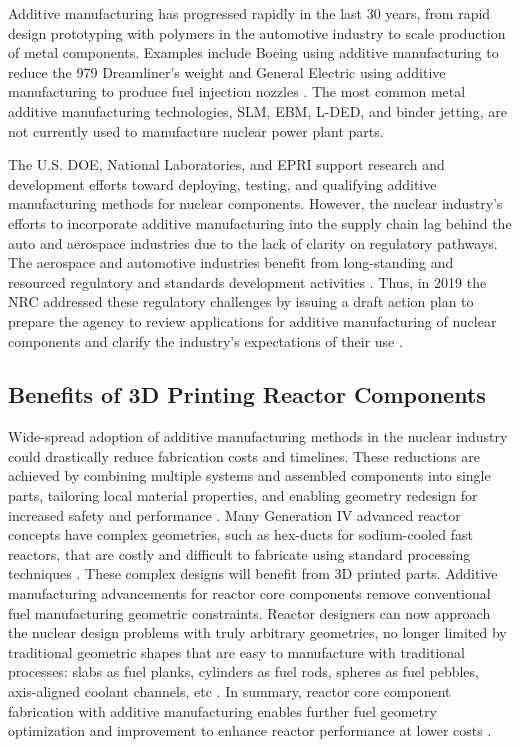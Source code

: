 Additive manufacturing has progressed rapidly in the last 30 years, from rapid 
design prototyping with polymers in the automotive industry to scale production 
of metal components.  
Examples include Boeing using additive manufacturing to reduce the 979 
Dreamliner's weight \cite{noauthor_printed_2017} and General Electric using 
additive manufacturing to produce fuel injection nozzles 
\cite{noauthor_transformation_2018}. 
The most common metal additive manufacturing technologies, \gls{SLM}, \gls{EBM}, 
\gls{L-DED}, and binder jetting, are not currently used to manufacture nuclear 
power plant parts. 

The U.S. \gls{DOE}, National Laboratories, and \gls{EPRI} support research and 
development efforts toward deploying, testing, and qualifying additive 
manufacturing methods for nuclear components. 
However, the nuclear industry's efforts to incorporate additive manufacturing 
into the supply chain lag behind the auto and aerospace industries due to the 
lack of clarity on regulatory pathways. 
The aerospace and automotive industries benefit from long-standing and resourced 
regulatory and standards development activities \cite{noauthor_roadmap_nodate}. 
Thus, in 2019 the \gls{NRC} addressed these regulatory challenges by issuing 
a draft action plan to prepare the agency to review applications for 
additive manufacturing of nuclear components and clarify the industry's 
expectations of their use \cite{noauthor_roadmap_nodate}.

\subsection{Benefits of 3D Printing Reactor Components}
\label{sec:am}
Wide-spread adoption of additive manufacturing methods in the nuclear industry 
could drastically reduce fabrication costs and timelines.
These reductions are achieved by combining multiple systems and assembled 
components into single parts, tailoring local material properties, and enabling 
geometry redesign for increased safety and performance 
\cite{simpson_considerations_2019}. 
Many Generation IV advanced reactor concepts have complex geometries, 
such as hex-ducts for sodium-cooled fast reactors, that are costly and difficult 
to fabricate using standard processing techniques \cite{sridharan_performance_2019}.  
These complex designs will benefit from 3D printed parts. 
Additive manufacturing advancements for reactor core components remove
conventional fuel manufacturing geometric constraints.
Reactor designers can now approach the nuclear design problems with truly 
arbitrary geometries, no longer limited by traditional geometric shapes that are 
easy to manufacture with traditional processes: slabs as fuel planks, cylinders 
as fuel rods, spheres as fuel pebbles, axis-aligned coolant channels, etc 
\cite{sobes_artificial_2020}.
In summary, reactor core component fabrication with additive manufacturing 
enables further fuel geometry optimization and improvement to enhance 
reactor performance at lower costs \cite{bergeron_early_2018}. 


